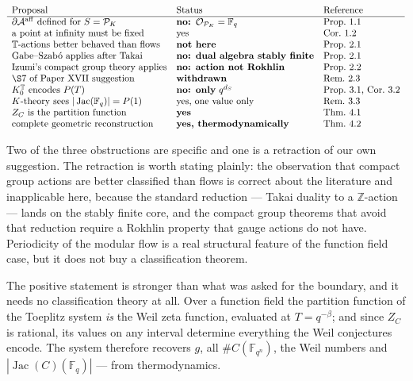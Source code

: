 \documentclass[11pt]{amsart}
\numberwithin{equation}{section}
\theoremstyle{definition}
\theoremstyle{remark}
\newcommand{\Z}{\mathbb{Z}}
\newcommand{\F}{\mathbb{F}}
\newcommand{\T}{\mathbb{T}}
\newcommand{\cA}{\mathcal{A}}
\newcommand{\cO}{\mathcal{O}}
\newcommand{\cP}{\mathcal{P}}
\newcommand{\Jac}{\operatorname{Jac}}
\begin{document}
\[
\begin{array}{lll}
\text{Proposal} & \text{Status} & \text{Reference}\\\hline
\partial\cA^{\mathrm{aff}}\ \text{defined for}\ S=\cP_K & \textbf{no: }\cO_{\cP_K}=\F_q & \text{Prop.~1.1}\\
\text{a point at infinity must be fixed} & \text{yes} & \text{Cor.~1.2}\\
\T\text{-actions better behaved than flows} & \textbf{not here} & \text{Prop.~2.1}\\
\text{Gabe--Szab\'o applies after Takai} & \textbf{no: dual algebra stably finite} & \text{Prop.~2.1}\\
\text{Izumi's compact group theory applies} & \textbf{no: action not Rokhlin} & \text{Prop.~2.2}\\
\text{\S7 of Paper XVII suggestion} & \textbf{withdrawn} & \text{Rem.~2.3}\\
K_0^\T\ \text{encodes}\ P(T) & \textbf{no: only}\ q^{d_S} & \text{Prop.~3.1, Cor.~3.2}\\
K\text{-theory sees}\ |\Jac(\F_q)|=P(1) & \text{yes, one value only} & \text{Rem.~3.3}\\
Z_C\ \text{is the partition function} & \textbf{yes} & \text{Thm.~4.1}\\
\text{complete geometric reconstruction} & \textbf{yes, thermodynamically} & \text{Thm.~4.2}
\end{array}
\]

Two of the three obstructions are specific and one is a retraction of our own suggestion. The
retraction is worth stating plainly: the observation that compact group actions are better
classified than flows is correct about the literature and inapplicable here, because the
standard reduction --- Takai duality to a $\Z$-action --- lands on the stably finite core,
and the compact group theorems that avoid that reduction require a Rokhlin property that
gauge actions do not have. Periodicity of the modular flow is a real structural feature of
the function field case, but it does not buy a classification theorem.

The positive statement is stronger than what was asked for the boundary, and it needs no
classification theory at all. Over a function field the partition function of the Toeplitz
system \emph{is} the Weil zeta function, evaluated at $T=q^{-\beta}$; and since $Z_C$ is
rational, its values on any interval determine everything the Weil conjectures encode. The
system therefore recovers $g$, all $\#C(\F_{q^n})$, the Weil numbers and $|\Jac(C)(\F_q)|$ ---
from thermodynamics.
\end{document}
